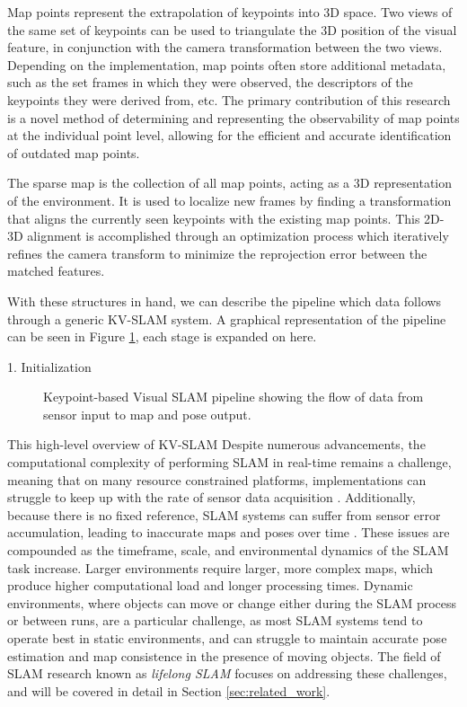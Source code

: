 Map points represent the extrapolation of keypoints into 3D space. Two views of the same set of keypoints can be used to triangulate the 3D position of the visual feature, in conjunction with the camera transformation between the two views. Depending on the implementation, map points often store additional metadata, such as the set frames in which they were observed, the descriptors of the keypoints they were derived from, etc. The primary contribution of this research is a novel method of determining and representing the observability of map points at the individual point level, allowing for the efficient and accurate identification of outdated map points.

The sparse map is the collection of all map points, acting as a 3D representation of the environment. It is used to localize new frames by finding a transformation that aligns the currently seen keypoints with the existing map points. This 2D-3D alignment is accomplished through an optimization process which iteratively refines the camera transform to minimize the reprojection error between the matched features.

With these structures in hand, we can describe the pipeline which data follows through a generic KV-SLAM system. A graphical representation of the pipeline can be seen in Figure \ref{fig:kv_slam_pipeline}, each stage is expanded on here.

1. Initialization

\begin{figure}[!ht]
    \centering
    \caption{Keypoint-based Visual SLAM pipeline showing the flow of data from sensor input to map and pose output.}
    \label{fig:kv_slam_pipeline}
\end{figure}

This high-level overview of KV-SLAM Despite numerous advancements, the computational complexity of performing SLAM in real-time remains a challenge, meaning that on many resource constrained platforms, implementations can struggle to keep up with the rate of sensor data acquisition \cite{semenovaQuantitativeAnalysisSystem2022}. Additionally, because there is no fixed reference, SLAM systems can suffer from sensor error accumulation, leading to inaccurate maps and poses over time \cite{cadenaPresentFutureSimultaneous2016}. These issues are compounded as the timeframe, scale, and environmental dynamics of the SLAM task increase. Larger environments require larger, more complex maps, which produce higher computational load and longer processing times. Dynamic environments, where objects can move or change either during the SLAM process or between runs, are a particular challenge, as most SLAM systems tend to operate best in static environments, and can struggle to maintain accurate pose estimation and map consistence in the presence of moving objects. The field of SLAM research known as \textit{lifelong SLAM} \cite{cadenaPresentFutureSimultaneous2016} focuses on addressing these challenges, and will be covered in detail in Section \ref{sec:related_work}.
